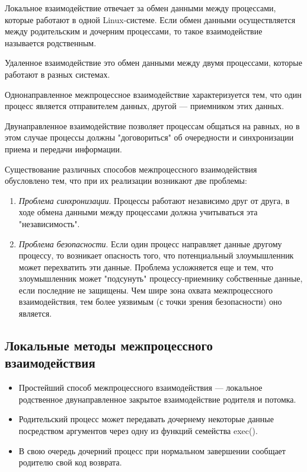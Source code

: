 \documentclass{beamer}
\begin{document}
\begin{frame}
\begin{block}{Локальное взаимодействие}
отвечает за обмен данными между процессами, которые работают в одной Linux-системе. Если обмен данными осуществляется между родительским и дочерним процессами, то такое взаимодействие называется родственным.
\end{block}
\begin{block}{Удаленное взаимодействие}
это обмен данными между двумя процессами, которые работают в разных системах. 
\end{block}
\begin{block}{Однонаправленное межпроцессное взаимодействие }
характеризуется тем, что один процесс является отправителем данных, другой — приемником этих данных.
\end{block}
\begin{block}{Двунаправленное взаимодействие}
позволяет процессам общаться на равных, но в этом случае процессы должны "договориться" об очередности и синхронизации приема и передачи информации.
\end{block}
\end{frame}

\begin{frame}
Существование различных способов межпроцессного взаимодействия обусловлено тем, что при их реализации возникают две проблемы:
\begin{enumerate}
\item \textit{Проблема синхронизации}. Процессы работают независимо друг от друга, в ходе обмена данными между процессами должна учитываться эта "независимость".
\item \textit{Проблема безопасности}. Если один процесс направляет данные другому процессу, то возникает опасность того, что потенциальный злоумышленник может перехватить эти данные. Проблема усложняется еще и тем, что злоумышленник может "подсунуть" процессу-приемнику собственные данные, если последние не защищены. Чем шире зона охвата межпроцессного взаимодействия, тем более уязвимым (с точки зрения безопасности) оно является.
\end{enumerate}
\end{frame}

\subsection{Локальные методы межпроцессного взаимодействия}

\begin{frame}
\begin{itemize}
\item Простейший способ межпроцессного взаимодействия — локальное родственное двунаправленное закрытое взаимодействие родителя и потомка.
\item Родительский процесс может передавать дочернему некоторые данные посредством аргументов через
одну из функций семейства exec(). 
\item В свою очередь дочерний процесс при нормальном завершении сообщает родителю свой код возврата. 
\end{itemize}
\end{frame}
\end{document}
